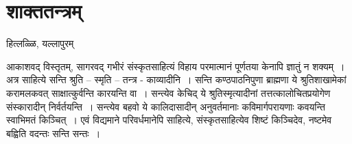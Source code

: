 {\fontsize{15}{17}\selectfont
\chapter{शाक्ततन्त्रम्}

\begin{center}
\smallskip
हित्लळ्ळि, यल्लापुरम्
\addrule
\end{center}

आकाशवद् विस्तृतम्, सागरवद् गभीरं संस्कृतसाहित्यं विहाय परमात्मानं पूर्णतया केनापि ज्ञातुं न शक्यम्~। अत्र साहित्ये सन्ति श्रुति – स्मृति – तन्त्र - काव्यादीनि~। सन्ति कण्ठपाठनिपुणा ब्राह्मणा ये श्रुतिशाखामेकां करामलकवत् साक्षात्कुर्वन्ति कारयन्ति वा~। सन्त्येव केचिद् ये श्रुतिस्मृत्यादीनां तत्तत्कालोचितप्रयोगेण संस्कारादीन् निर्वर्तयन्ति~। सन्त्येव बहवो ये कालिदासादीन् अनुवर्तमानाः कविमार्गपरायणाः कवयन्ति स्वाभिमतं किञ्चित्~। एवं विद्यमाने परिवर्धमानेपि साहित्ये, संस्कृतसाहित्येव शिष्टं किञ्चिदेव, नष्टमेव बह्विति वदन्तः सन्ति सन्तः~। 

}
